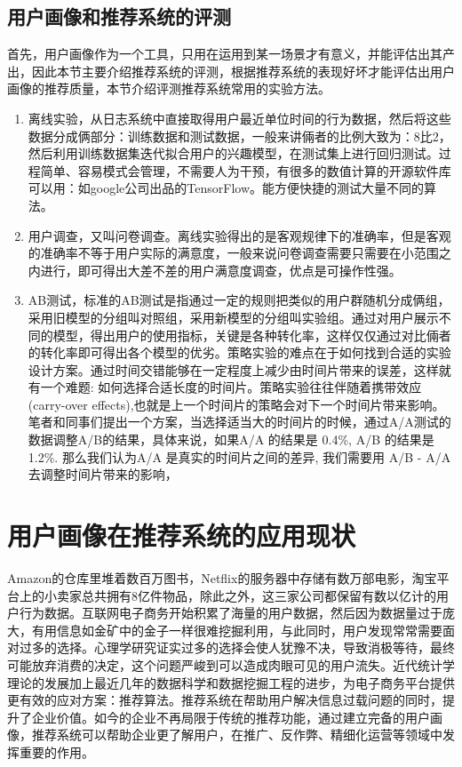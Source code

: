 		\subsection{用户画像和推荐系统的评测}
		首先，用户画像作为一个工具，只用在运用到某一场景才有意义，并能评估出其产出，因此本节主要介绍推荐系统的评测，根据推荐系统的表现好坏才能评估出用户画像的推荐质量，本节介绍评测推荐系统常用的实验方法。
			\begin{enumerate}[(1)]
			\item 离线实验，从日志系统中直接取得用户最近单位时间的行为数据，然后将这些数据分成俩部分：训练数据和测试数据，一般来讲倆者的比例大致为：8比2，然后利用训练数据集迭代拟合用户的兴趣模型，在测试集上进行回归测试。过程简单、容易模式会管理，不需要人为干预，有很多的数值计算的开源软件库可以用：如google公司出品的TensorFlow。能方便快捷的测试大量不同的算法。
			\item 用户调查，又叫问卷调查。离线实验得出的是客观规律下的准确率，但是客观的准确率不等于用户实际的满意度，一般来说问卷调查需要只需要在小范围之内进行，即可得出大差不差的用户满意度调查，优点是可操作性强。
			\item AB测试，标准的AB测试是指通过一定的规则把类似的用户群随机分成俩组，采用旧模型的分组叫对照组，采用新模型的分组叫实验组。通过对用户展示不同的模型，得出用户的使用指标，关键是各种转化率，这样仅仅通过对比倆者的转化率即可得出各个模型的优劣。策略实验的难点在于如何找到合适的实验设计方案。通过时间交错能够在一定程度上减少由时间片带来的误差，这样就有一个难题:  如何选择合适长度的时间片。策略实验往往伴随着携带效应(carry-over effects),也就是上一个时间片的策略会对下一个时间片带来影响。笔者和同事们提出一个方案，当选择适当大的时间片的时候，通过A/A测试的数据调整A/B的结果，具体来说，如果A/A 的结果是 0.4\%, A/B 的结果是 1.2\%. 那么我们认为A/A  是真实的时间片之间的差异, 我们需要用 A/B - A/A 去调整时间片带来的影响，
			\end{enumerate}

	\section{用户画像在推荐系统的应用现状}
	Amazon的仓库里堆着数百万图书，Netflix的服务器中存储有数万部电影，淘宝平台上的小卖家总共拥有8亿件物品，除此之外，这三家公司都保留有数以亿计的用户行为数据。互联网电子商务开始积累了海量的用户数据，然后因为数据量过于庞大，有用信息如金矿中的金子一样很难挖掘利用，与此同时，用户发现常常需要面对过多的选择。心理学研究证实过多的选择会使人犹豫不决，导致消极等待，最终可能放弃消费的决定，这个问题严峻到可以造成肉眼可见的用户流失。近代统计学理论的发展加上最近几年的数据科学和数据挖掘工程的进步，为电子商务平台提供更有效的应对方案：推荐算法。推荐系统在帮助用户解决信息过载问题的同时，提升了企业价值。如今的企业不再局限于传统的推荐功能，通过建立完备的用户画像，推荐系统可以帮助企业更了解用户，在推广、反作弊、精细化运营等领域中发挥重要的作用。

